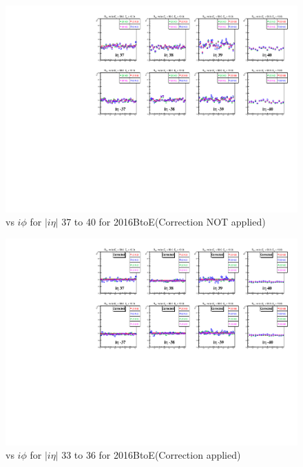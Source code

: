 \begin{figure}[h!]
\centering
\includegraphics[width=0.99\linewidth]{../Figures/Chap2/ImageFiles_HF/Ratio/2016/Corrected/2016BtoE/ieta37_40_E1E2Cut3Ietaiphi}
\caption{\ratiosl vs $i\phi$ for $|i\eta|$ 37 to 40 for 2016BtoE(Correction NOT applied)}
\label{fig:ieta37_40_E1E2Cut3IetaiphiBtoE}
\end{figure}
\begin{figure}[h!]
\centering
\includegraphics[width=0.99\linewidth]{../Figures/Chap2/ImageFiles_HF/Ratio/2016/Corrected/2016BtoE/ieta37_40_E1E2Cut3Ietaiphi_Crrtd}
\caption{\ratiosl vs $i\phi$ for $|i\eta|$ 33 to 36 for 2016BtoE(Correction applied)}
\label{fig:ieta37_40_E1E2Cut3Ietaiphi_CrrtdBtoE}
\end{figure}
\newpage
